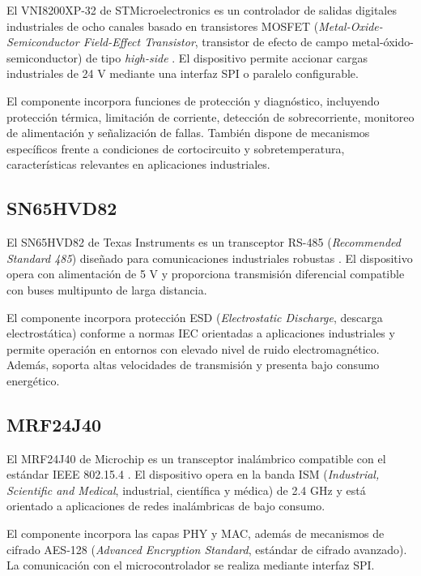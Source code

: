 El VNI8200XP-32 de STMicroelectronics es un controlador de salidas digitales industriales de ocho canales basado en transistores MOSFET (\textit{Metal-Oxide-Semicon\-ductor Field-Effect Transistor}, transistor de efecto de campo metal-óxido-semicon\-ductor) de tipo \textit{high-side} \cite{vni8200xp32}. El dispositivo permite accionar cargas industriales de 24 V mediante una interfaz SPI o paralelo configurable.

El componente incorpora funciones de protección y diagnóstico, incluyendo protección térmica, limitación de corriente, detección de sobrecorriente, monitoreo de alimentación y señalización de fallas. También dispone de mecanismos específicos frente a condiciones de cortocircuito y sobretemperatura, características relevantes en aplicaciones industriales.

\subsection{SN65HVD82}

El SN65HVD82 de Texas Instruments es un transceptor RS-485 (\textit{Recommended Standard 485}) diseñado para comunicaciones industriales robustas \cite{sn65hvd82}. El dispositivo opera con alimentación de 5 V y proporciona transmisión diferencial compatible con buses multipunto de larga distancia.

El componente incorpora protección ESD (\textit{Electrostatic Discharge}, descarga electrostática) conforme a normas IEC orientadas a aplicaciones industriales y permite operación en entornos con elevado nivel de ruido electromagnético. Además, soporta altas velocidades de transmisión y presenta bajo consumo energético.

\subsection{MRF24J40}

El MRF24J40 de Microchip es un transceptor inalámbrico compatible con el estándar IEEE 802.15.4 \cite{mrf24j40}. El dispositivo opera en la banda ISM (\textit{Industrial, Scientific and Medical}, industrial, científica y médica) de 2.4 GHz y está orientado a aplicaciones de redes inalámbricas de bajo consumo.

El componente incorpora las capas PHY y MAC, además de mecanismos de cifrado AES-128 (\textit{Advanced Encryption Standard}, estándar de cifrado avanzado). La comunicación con el microcontrolador se realiza mediante interfaz SPI.

